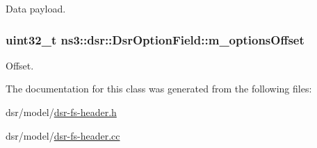 Data payload. 

\subsubsection[{\texorpdfstring{m\+\_\+options\+Offset}{m_optionsOffset}}]{\setlength{\rightskip}{0pt plus 5cm}uint32\+\_\+t ns3\+::dsr\+::\+Dsr\+Option\+Field\+::m\+\_\+options\+Offset\hspace{0.3cm}{\ttfamily [private]}}\hypertarget{classns3_1_1dsr_1_1DsrOptionField_a88460b666473d17276c6b157d02b0031}{}\label{classns3_1_1dsr_1_1DsrOptionField_a88460b666473d17276c6b157d02b0031}


Offset. 



The documentation for this class was generated from the following files\+:\begin{DoxyCompactItemize}
\item 
dsr/model/\hyperlink{dsr-fs-header_8h}{dsr-\/fs-\/header.\+h}\item 
dsr/model/\hyperlink{dsr-fs-header_8cc}{dsr-\/fs-\/header.\+cc}\end{DoxyCompactItemize}
